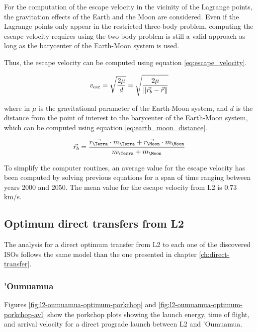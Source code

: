 For the computation of the escape velocity in the vicinity of the Lagrange
points, the gravitation effects of the Earth and the Moon are considered. Even
if the Lagrange points only appear in the restricted three-body problem,
computing the escape velocity requires using the two-body problem is still a
valid approach as long as the barycenter of the Earth-Moon system is used.

Thus, the escape velocity can be computed using equation \ref{eq:escape_velocity}.

\begin{equation}
  v_{\text{esc}} = \sqrt{\frac{2 \mu}{d}} = \sqrt{\frac{2 \mu}{\lVert\vec{r_b} - \vec{r}\rVert}}
  \label{eq:escape_velocity}
\end{equation}

where in $\mu$ is the gravitational parameter of the Earth-Moon system, and $d$
is the distance from the point of interest to the barycenter of the Earth-Moon
system, which can be computed using equation \ref{eq:earth_moon_distance}.

\begin{equation}
  \vec{r_{b}} = \frac{\vec{r_{\text{\Terra}}} \cdot m_{\text{\Terra}}
    + \vec{r_{\text{\Moon}}} \cdot m_{\text{\Moon}}}{m_{\text{\Terra}} +
    m_{\text{\Moon}}}
  \label{eq:earth_moon_distance}
\end{equation}

To simplify the computer routines, an average value for the escape velocity has
been computed by solving previous equations for a span of time ranging between
years 2000 and 2050. The mean value for the escape velocity from L2 is $0.73$
km/s.

\subsection{Optimum direct transfers from L2}

The analysis for a direct optimum transfer from L2 to each one of the discovered
ISOs follows the same model than the one presented in chapter
\ref{ch:direct-transfer}.

\subsubsection{'Oumuamua}

Figures \ref{fig:l2-oumuamua-optimum-porkchop} and
\ref{fig:l2-oumuamua-optimum-porkchop-avl} show the porkchop plots showing the
launch energy, time of flight, and arrival velocity for a direct prograde launch
between L2 and 'Oumuamua.

